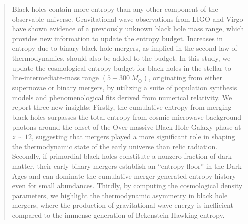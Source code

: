 \documentclass[twocolumn]{aastex631}
\begin{document}
\begin{abstract}
Black holes contain more entropy than any other component of the observable universe. Gravitational-wave observations from LIGO and Virgo have shown evidence of a previously unknown black hole mass range, which provides new information to update the entropy budget. Increases in entropy due to binary black hole mergers, as implied in the second law of thermodynamics, should also be added to the budget. In this study, we update the cosmological entropy budget for black holes in the stellar to lite-intermediate-mass range $(5-300~M_\odot)$, originating from either supernovae or binary mergers, by utilizing a suite of population synthesis models and phenomenological fits derived from numerical relativity. We report three new insights: Firstly, the cumulative entropy from merging black holes surpasses the total entropy from cosmic microwave background photons around the onset of the Over-massive Black Hole Galaxy phase at $z\sim 12$, suggesting that mergers played a more significant role in shaping the thermodynamic state of the early universe than relic radiation. Secondly, if primordial black holes constitute a nonzero fraction of dark matter, their early binary mergers establish an ``entropy floor” in the Dark Ages and can dominate the cumulative merger-generated entropy history even for small abundances. Thirdly, by computing the cosmological density parameters, we highlight the thermodynamic asymmetry in black hole mergers, where the production of gravitational-wave energy is inefficient compared to the immense generation of Bekenstein-Hawking entropy.








\end{abstract}
\end{document}
